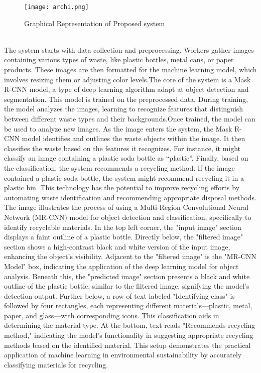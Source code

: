 \documentclass[12pt, English]{article}
\begin{document}
\begin{figure}[htb]
\begin{center}
\texttt{[image: archi.png]}
\end{center}
\begin{center}
\renewcommand{\thefigure}{3.1.1}
\caption{\footnotesize  Graphical Representation of Proposed system}
\end{center}
\end{figure}\\
The system starts with data collection and preprocessing. Workers gather images containing various types of waste, like plastic bottles, metal cans, or paper products.  These images are then formatted for the machine learning model, which involves resizing them or adjusting color levels.The core of the system is a Mask R-CNN model, a type of deep learning algorithm adapt at object detection and segmentation. This model is trained on the preprocessed data. During training, the model analyzes the images, learning to recognize features that distinguish between different waste types and their backgrounds.Once trained, the model can be used to analyze new images. As the image enters the system, the Mask R-CNN model identifies and outlines the waste objects within the image. It then classifies the waste based on the features it recognizes.  For instance, it might classify an image containing a plastic soda bottle as “plastic”. Finally, based on the classification, the system recommends a recycling method. If the image contained a plastic soda bottle, the system might recommend recycling it in a plastic bin.
This technology has the potential to improve recycling efforts by automating waste identification and recommending appropriate disposal methods.\\
The image illustrates the process of using a Multi-Region Convolutional Neural Network (MR-CNN) model for object detection and classification, specifically to identify recyclable materials. In the top left corner, the "input image" section displays a faint outline of a plastic bottle. Directly below, the "filtered image" section shows a high-contrast black and white version of the input image, enhancing the object's visibility. Adjacent to the "filtered image" is the "MR-CNN Model" box, indicating the application of the deep learning model for object analysis. Beneath this, the "predicted image" section presents a black and white outline of the plastic bottle, similar to the filtered image, signifying the model's detection output. Further below, a row of text labeled "Identifying class" is followed by four rectangles, each representing different materials—plastic, metal, paper, and glass—with corresponding icons. This classification aids in determining the material type. At the bottom, text reads "Recommends recycling method," indicating the model's functionality in suggesting appropriate recycling methods based on the identified material. This setup demonstrates the practical application of machine learning in environmental sustainability by accurately classifying materials for recycling.\\
\end{document}
